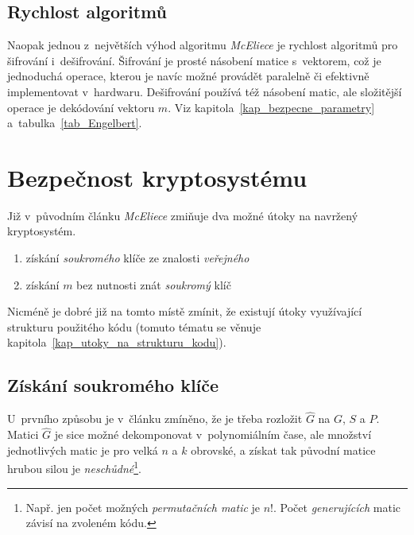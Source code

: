 \documentclass[thesis=M,czech,hidelinks]{FITthesis}[2012/06/26]
\newcommand{\0}{{\textcolor[gray]{0.75}{0}}}
\begin{document}
\subsection{Rychlost algoritmů}

Naopak jednou z~největších výhod algoritmu \emph{McEliece} je rychlost algoritmů
pro šifrování i~dešifrování. Šifrování je prosté násobení matice s~vektorem, což
je jednoduchá operace, kterou je navíc možné provádět paralelně či efektivně
implementovat v~hardwaru. Dešifrování používá též násobení matic, ale složitější
operace je dekódování vektoru $\hat{m}$. Viz
kapitola~\ref{kap_bezpecne_parametry} a~tabulka~\ref{tab_Engelbert}.



\section{Bezpečnost kryptosystému}\label{kap_bezpecnost}

Již v~původním článku \cite{McEliece} \emph{McEliece} zmiňuje dva možné útoky na
navržený kryptosystém.

\begin{enumerate}
    \item získání \emph{soukromého} klíče ze znalosti \emph{veřejného}
    \item získání $m$ bez nutnosti znát \emph{soukromý} klíč
\end{enumerate}

Nicméně je dobré již na tomto místě zmínit, že existují útoky využívající
strukturu použitého kódu (tomuto tématu se věnuje
kapitola~\ref{kap_utoky_na_strukturu_kodu}).


\subsection{Získání soukromého klíče}

U~prvního způsobu je v~článku zmíněno, že je třeba rozložit $\hat{G}$ na $G$,
$S$ a $P$.  Matici $\hat{G}$ je sice možné dekomponovat v~polynomiálním čase,
ale množství jednotlivých matic je pro velká $n$ a $k$ obrovské, a získat tak
původní matice hrubou silou je \emph{neschůdné}\footnote{
    Např. jen počet možných \emph{permutačních matic} je $n!$. Počet
    \emph{generujících} matic závisí na zvoleném kódu.
}.
\end{document}
